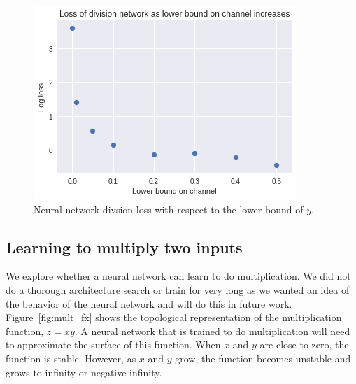 \begin{figure}
\begin{center}
\includegraphics{figures/equal/Channel_lower_bound_division.png}
\caption{Neural network divsion loss with respect to the lower bound of $y$.}
\label{fig:one_tap_inv}
\end{center}
\end{figure}

\subsection{Learning to multiply two inputs}



We explore whether a neural network can learn to do multiplication. We did not do a thorough architecture search or train for very long as we wanted an idea of the behavior of the neural network and will do this in future work. 
Figure~\ref{fig:mult_fx} shows the topological representation of the multiplication function, $z=xy$.  A neural network that is trained to do multiplication will need to approximate the surface of this function.  
When $x$ and $y$ are close to zero, the function is stable.  However, as $x$ and $y$ grow, the function becomes unstable and grows to infinity or negative infinity.


